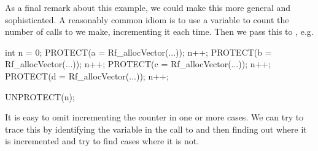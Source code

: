 As a final remark about this example, we could make this more general
and sophisticated.  A reasonably common idiom is to use a variable to
count the number of calls to  we make, incrementing it
each time. Then we pass this to , e.g.
\begin{CCode}
 int n = 0;
 PROTECT(a = Rf_allocVector(...)); n++;
 PROTECT(b = Rf_allocVector(...)); n++;
 PROTECT(c = Rf_allocVector(...)); n++;
 PROTECT(d = Rf_allocVector(...)); n++;

 UNPROTECT(n);
\end{CCode}
 It is easy to omit incrementing the counter in one
or more cases. We can try to trace this by identifying the variable in
the call to  and then finding out where it is
incremented and try to find cases where it is not.


